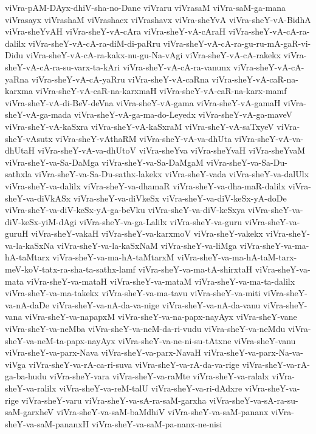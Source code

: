 {viVra-pAM-DAyx-dhiV-sha-no-Dane
viVraru
viVrasaM
viVra-saM-ga-mana
viVrasayx
viVrashaM
viVrashacx
viVrashavx
viVra-sheYvA
viVra-sheY-vA-BidhA
viVra-sheYvAH
viVra-sheY-vA-cAra
viVra-sheY-vA-cAraH
viVra-sheY-vA-cA-ra-dalilx
viVra-sheY-vA-cA-ra-diM-di-paRru
viVra-sheY-vA-cA-ra-gu-ru-mA-gaR-vi-Didu
viVra-sheY-vA-cA-ra-kakx-nu-gu-Na-vAgi
viVra-sheY-vA-cA-rakekx
viVra-sheY-vA-cA-ra-su-varx-ta-kAri
viVra-sheY-vA-cA-ra-vanunx
viVra-sheY-vA-cA-yaRna
viVra-sheY-vA-cA-yaRru
viVra-sheY-vA-caRna
viVra-sheY-vA-caR-na-karxma
viVra-sheY-vA-caR-na-karxmaH
viVra-sheY-vA-caR-na-karx-mamf
viVra-sheY-vA-di-BeV-deVna
viVra-sheY-vA-gama
viVra-sheY-vA-gamaH
viVra-sheY-vA-ga-mada
viVra-sheY-vA-ga-ma-do-Leyedx
viVra-sheY-vA-ga-maveV
viVra-sheY-vA-kaSxra
viVra-sheY-vA-kaSxraM
viVra-sheY-vA-saTxyeV
viVra-sheY-vAsutx
viVra-sheY-vAthaRM
viVra-sheY-vA-va-dhUta
viVra-sheY-vA-va-dhUtaH
viVra-sheY-vA-va-dhUtoV
viVra-sheYva
viVra-sheYvaH
viVra-sheYvaM
viVra-sheY-va-Sa-DaMga
viVra-sheY-va-Sa-DaMgaM
viVra-sheY-va-Sa-Du-sathxla
viVra-sheY-va-Sa-Du-sathx-lakekx
viVra-sheY-vada
viVra-sheY-va-dalUlx
viVra-sheY-va-dalilx
viVra-sheY-va-dhamaR
viVra-sheY-va-dha-maR-dalilx
viVra-sheY-va-diVkASx
viVra-sheY-va-diVkeSx
viVra-sheY-va-diV-keSx-yA-doDe
viVra-sheY-va-diV-keSx-yA-ga-beVku
viVra-sheY-va-diV-keSxya
viVra-sheY-va-diV-keSx-yiM-dAgi
viVra-sheY-va-ga-Lalilx
viVra-sheY-va-guru
viVra-sheY-va-guruH
viVra-sheY-vakaH
viVra-sheY-va-karxmoV
viVra-sheY-vakekx
viVra-sheY-va-la-kaSxNa
viVra-sheY-va-la-kaSxNaM
viVra-sheY-va-liMga
viVra-sheY-va-ma-hA-taMtarx
viVra-sheY-va-ma-hA-taMtarxM
viVra-sheY-va-ma-hA-taM-tarx-meV-koV-tatx-ra-sha-ta-sathx-lamf
viVra-sheY-va-ma-tA-shirxtaH
viVra-sheY-va-mata
viVra-sheY-va-mataH
viVra-sheY-va-mataM
viVra-sheY-va-ma-ta-dalilx
viVra-sheY-va-ma-takekx
viVra-sheY-va-ma-tavu
viVra-sheY-va-miti
viVra-sheY-va-nA-daDe
viVra-sheY-va-nA-da-va-nige
viVra-sheY-va-nA-da-vanu
viVra-sheY-vana
viVra-sheY-va-napapxM
viVra-sheY-va-na-papx-nayAyx
viVra-sheY-vane
viVra-sheY-va-neMba
viVra-sheY-va-neM-da-ri-vudu
viVra-sheY-va-neMdu
viVra-sheY-va-neM-ta-papx-nayAyx
viVra-sheY-va-ne-ni-su-tAtxne
viVra-sheY-vanu
viVra-sheY-va-parx-Nava
viVra-sheY-va-parx-NavaH
viVra-sheY-va-parx-Na-va-viVga
viVra-sheY-va-rA-ca-ri-suva
viVra-sheY-va-rA-da-va-rige
viVra-sheY-va-rA-ga-ba-hudu
viVra-sheY-vara
viVra-sheY-va-raMte
viVra-sheY-va-ralalx
viVra-sheY-va-ralilx
viVra-sheY-va-reM-talU
viVra-sheY-va-ri-dAdxre
viVra-sheY-va-rige
viVra-sheY-varu
viVra-sheY-va-sA-ra-saM-garxha
viVra-sheY-va-sA-ra-su-saM-garxheV
viVra-sheY-va-saM-baMdhiV
viVra-sheY-va-saM-pananx
viVra-sheY-va-saM-pananxH
viVra-sheY-va-saM-pa-nanx-ne-nisi
}
